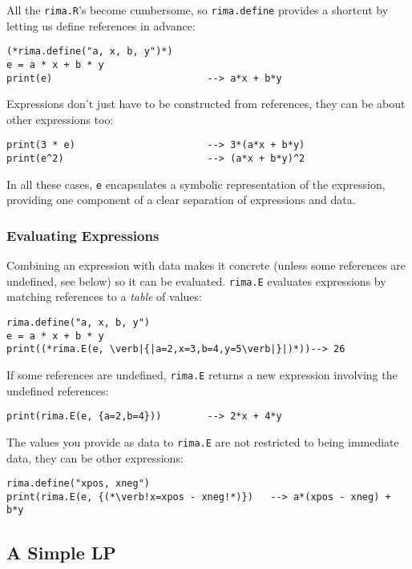 \documentclass[a4paper,12pt]{article}
\begin{document}
All the \lstinline!rima.R!'s become cumbersome, so \lstinline!rima.define! provides a shortcut
by letting us define references in advance:
  \begin{lstlisting}
(*rima.define("a, x, b, y")*)
e = a * x + b * y
print(e)                           --> a*x + b*y
  \end{lstlisting}

Expressions don't just have to be constructed from references,
they can be about other expressions too:
  \begin{lstlisting}
print(3 * e)                       --> 3*(a*x + b*y)
print(e^2)                         --> (a*x + b*y)^2
  \end{lstlisting}

In all these cases, \lstinline!e! encapsulates a symbolic representation of the expression,
providing one component of a clear separation of expressions and data.

\subsubsection{Evaluating Expressions}

Combining an expression with data makes it concrete
(unless some references are undefined, see below)
so it can be evaluated.
\lstinline!rima.E! evaluates expressions by matching references to a \emph{table} of values:
  \begin{lstlisting}
rima.define("a, x, b, y")
e = a * x + b * y
print((*rima.E(e, \verb|{|a=2,x=3,b=4,y=5\verb|}|)*))--> 26
  \end{lstlisting}

If some references are undefined, \lstinline!rima.E! returns a new expression involving
the undefined references:
  \begin{lstlisting}
print(rima.E(e, {a=2,b=4}))        --> 2*x + 4*y
  \end{lstlisting}

The values you provide as data to \lstinline!rima.E! are not restricted to being immediate data,
they can be other expressions:
  \begin{lstlisting}
rima.define("xpos, xneg")
print(rima.E(e, {(*\verb!x=xpos - xneg!*)})   --> a*(xpos - xneg) + b*y
  \end{lstlisting}


\subsection{A Simple LP}
\end{document}

